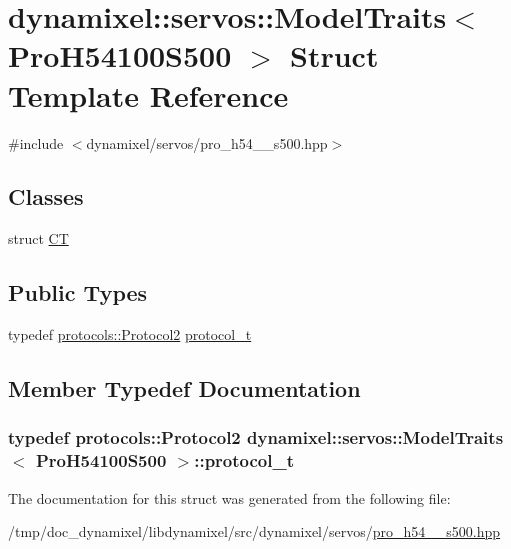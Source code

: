 \hypertarget{structdynamixel_1_1servos_1_1_model_traits_3_01_pro_h54100_s500_01_4}{}\section{dynamixel\+:\+:servos\+:\+:Model\+Traits$<$ Pro\+H54100\+S500 $>$ Struct Template Reference}
\label{structdynamixel_1_1servos_1_1_model_traits_3_01_pro_h54100_s500_01_4}


{\ttfamily \#include $<$dynamixel/servos/pro\+\_\+h54\+\_\+\_\+s500.\+hpp$>$}

\subsection*{Classes}
\begin{DoxyCompactItemize}
\item 
struct \hyperlink{structdynamixel_1_1servos_1_1_model_traits_3_01_pro_h54100_s500_01_4_1_1_c_t}{C\+T}
\end{DoxyCompactItemize}
\subsection*{Public Types}
\begin{DoxyCompactItemize}
\item 
typedef \hyperlink{classdynamixel_1_1protocols_1_1_protocol2}{protocols\+::\+Protocol2} \hyperlink{structdynamixel_1_1servos_1_1_model_traits_3_01_pro_h54100_s500_01_4_a16c80afe5f39285b5b7db40805c976cd}{protocol\+\_\+t}
\end{DoxyCompactItemize}


\subsection{Member Typedef Documentation}
\hypertarget{structdynamixel_1_1servos_1_1_model_traits_3_01_pro_h54100_s500_01_4_a16c80afe5f39285b5b7db40805c976cd}{}
\subsubsection[{protocol\+\_\+t}]{\setlength{\rightskip}{0pt plus 5cm}typedef {\bf protocols\+::\+Protocol2} {\bf dynamixel\+::servos\+::\+Model\+Traits}$<$ {\bf Pro\+H54100\+S500} $>$\+::{\bf protocol\+\_\+t}}\label{structdynamixel_1_1servos_1_1_model_traits_3_01_pro_h54100_s500_01_4_a16c80afe5f39285b5b7db40805c976cd}


The documentation for this struct was generated from the following file\+:\begin{DoxyCompactItemize}
\item 
/tmp/doc\+\_\+dynamixel/libdynamixel/src/dynamixel/servos/\hyperlink{pro__h54__100__s500_8hpp}{pro\+\_\+h54\+\_\+\_\+s500.\+hpp}\end{DoxyCompactItemize}
